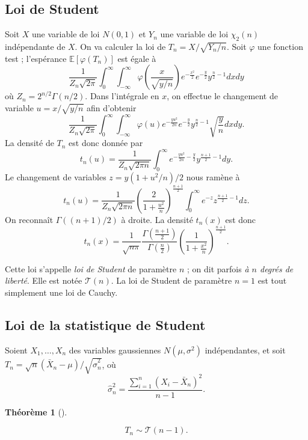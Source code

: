 \documentclass[
  10,
  letterpaper,
  DIV=11,
  numbers=noendperiod]{scrreport}
\theoremstyle{plain}
\newtheorem{theorem}{Théorème}[chapter]
\theoremstyle{definition}
\theoremstyle{plain}
\theoremstyle{definition}
\theoremstyle{definition}
\theoremstyle{plain}
\theoremstyle{remark}
\begin{document}
\hypertarget{sec-student1}{%
\subsection{Loi de Student}\label{sec-student1}}

Soit \(X\) une variable de loi \(N(0,1)\) et \(Y_n\) une variable de loi
\(\chi_2(n)\) indépendante de \(X\). On va calculer la loi de
\(T_n = X/\sqrt{Y_n/n}\). Soit \(\varphi\) une fonction test ;
l'espérance \(\mathbb{E}[\varphi(T_n)]\) est égale à
\[\frac{1}{Z_n\sqrt{2\pi}}\int_0^\infty \int_{-\infty}^{\infty}  \varphi\left(\frac{x}{\sqrt{y/n}}\right) e^{-\frac{x^2}{2}}e^{-\frac{y}{2}}y^{\frac{n}{2} - 1}dxdy \]
où \(Z_n = 2^{n/2}\Gamma(n/2)\). Dans l'intégrale en \(x\), on effectue
le changement de variable \(u = x/\sqrt{y/n}\) afin d'obtenir
\[\frac{1}{Z_n\sqrt{2\pi}}\int_0^\infty \int_{-\infty}^{\infty}  \varphi(u) e^{-\frac{yu^2}{2n}}e^{-\frac{y}{2}}y^{\frac{n}{2} - 1}\sqrt{\frac{y}{n}} dxdy. \]
La densité de \(T_n\) est donc donnée par
\[t_n(u)= \frac{1}{Z_n\sqrt{2\pi n}}\int_0^\infty  e^{-\frac{yu^2}{2n}-\frac{y}{2}}y^{\frac{n+1}{2}-1} dy. \]
Le changement de variables \(z = y(1+u^2/n)/2\) nous ramène à
\[t_n(u) = \frac{1}{Z_n\sqrt{2\pi n}}\left(\frac{2}{1+\frac{u^2}{n}}\right)^{\frac{n+1}{2}}\int_0^\infty  e^{-z}z^{\frac{n+1}{2}- 1} dz.\]
On reconnaît \(\Gamma((n+1)/2)\) à droite. La densité \(t_n(x)\) est
donc
\[t_n(x) = \frac{1}{\sqrt{n\pi}}\frac{\Gamma\left(\frac{n+1}{2}\right)}{\Gamma\left(\frac{n}{2}\right)}\left(\frac{1}{1 + \frac{x^2}{n}}\right)^{\frac{n+1}{2}}.\]

Cette loi s'appelle \emph{loi de Student} de paramètre \(n\) ; on dit
parfois \emph{à \(n\) degrés de liberté}. Elle est notée
\(\mathscr{T}(n)\). La loi de Student de paramètre \(n=1\) est tout
simplement une loi de Cauchy.

\hypertarget{sec-student2}{%
\subsection{Loi de la statistique de Student}\label{sec-student2}}

Soient \(X_1, \dotsc, X_n\) des variables gaussiennes
\(N(\mu, \sigma^2)\) indépendantes, et soit
\(T_n = \sqrt{n}(\bar{X}_n-\mu)/\sqrt{\hat{\sigma}^2_n}\), où
\[\hat{\sigma}^2_n = \frac{\sum_{i=1}^n (X_i - \bar{X}_n)^2}{n-1}. \]

\begin{theorem}[]\protect\hypertarget{thm-student_density}{}\label{thm-student_density}

\[T_n \sim \mathscr{T}(n-1).\]

\end{theorem}
\end{document}
